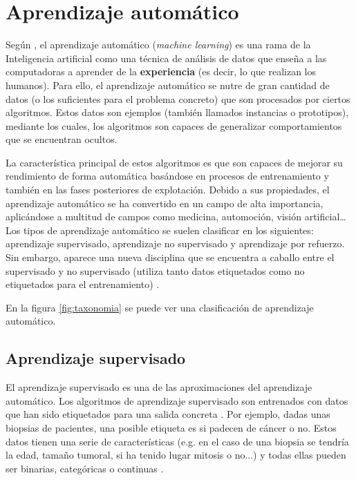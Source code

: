 

\section{Aprendizaje automático}

Según \cite{intelligent:ml}, el aprendizaje automático (\textit{machine
learning}) es una rama de la Inteligencia artificial como una técnica de
análisis de datos que enseña a las computadoras a aprender de la
\textbf{experiencia} (es decir, lo que realizan los humanos). Para ello, el
aprendizaje automático se nutre de gran cantidad de datos (o los suficientes
para el problema concreto) que son procesados por ciertos algoritmos. Estos
datos son ejemplos (también llamados instancias o prototipos), \cite{pascual:ml}
mediante los cuales, los algoritmos son capaces de generalizar comportamientos
que se encuentran ocultos. 

La característica principal de estos algoritmos es que son capaces de mejorar su
rendimiento de forma automática basándose en procesos de entrenamiento y también
en las fases posteriores de explotación. Debido a sus propiedades, el
aprendizaje automático se ha convertido en un campo de alta importancia,
aplicándose a multitud de campos como medicina, automoción, visión
artificial\ldots Los tipos de aprendizaje automático se suelen clasificar en los
siguientes: aprendizaje supervisado, aprendizaje no supervisado y aprendizaje
por refuerzo. Sin embargo, aparece una nueva disciplina que se encuentra a
caballo entre el supervisado y no supervisado (utiliza tanto datos etiquetados
como no etiquetados para el entrenamiento) \cite{vanEngelen2020}.

En la figura \ref{fig:taxonomia} se puede ver una
clasificación de aprendizaje automático.



\subsection{Aprendizaje supervisado}

El aprendizaje supervisado es una de las aproximaciones del aprendizaje
automático. Los algoritmos de aprendizaje supervisado son entrenados con datos
que han sido etiquetados para una salida concreta \cite{david:sl}. Por ejemplo,
dadas unas biopsias de pacientes, una posible etiqueta es si padecen de cáncer o
no. Estos datos tienen una serie de características (e.g. en el caso de una
biopsia se tendría la edad, tamaño tumoral, si ha tenido lugar mitosis o no...)
y todas ellas pueden ser binarias, categóricas o continuas \cite{salim:sl}.

